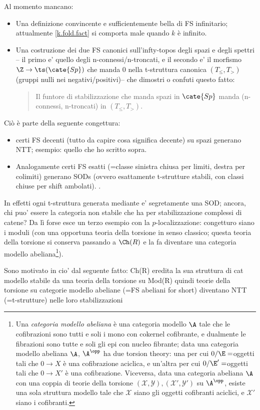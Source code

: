 


Al momento mancano:
\begin{itemize}
	\item Una definizione convincente e sufficientemente bella di FS infinitario; attualmente \ref{k.fold.fact} si comporta male quando $k$ è infinito.
	\item Una costruzione dei due FS canonici sull'infty-topos degli spazi e degli spettri -- il primo e' quello degli n-connessi/n-troncati, e il secondo e' il morfismo $\Z \to \ts(\cate{Sp})$ che manda 0 nella t-struttura canonica $(T_{\le}, T_{>})$ (gruppi nulli nei negativi/positivi)-- che dimostri o confuti questo fatto:
	\begin{quote}
		Il funtore di stabilizzazione che manda spazi in $\cate{Sp}$ manda (n-connessi, n-troncati) in $(T_{\le}, T_{>})$.
	\end{quote}
\end{itemize}

Ciò è parte della seguente congettura: 
\begin{itemize}
	\item certi FS decenti (tutto da capire cosa significa decente) su spazi generano NTT; esempio: quello che ho scritto sopra.
	\item Analogamente certi FS esatti (=classe sinistra chiusa per limiti, destra per colimiti) generano SODs (ovvero esattamente t-strutture stabili, con classi chiuse per shift ambolati). \cite[3.2.1]{tstructures}.
\end{itemize}
In effetti ogni t-struttura generata mediante \cite[3.2.1]{tstructures} e' segretamente una SOD; ancora, chi puo' essere la categoria non stabile che ha per stabilizzazione complessi di catene? Da lì forse esce un terzo esempio con la $p$-localizzazione: congetturo siano i moduli (con una opportuna teoria della torsione in senso classico; questa teoria della torsione si conserva passando a $\Ch(R)$ e la fa diventare una categoria modello abeliana\footnote{Una \emph{categoria modello abeliana} è una categoria modello $\A$ tale che le cofibrazioni sono tutti e soli i mono con cokernel cofibrante, e dualmente le fibrazioni sono tutte e soli gli epi con nucleo fibrante; data una categoria modello abeliana $\A$, $\A^\opp$ ha due torsion theory: una per cui $0/\E = $oggetti tali che $0\to X$ è una cofibrazione aciclica, e un'altra per cui $0/\E' = $oggetti tali che $0\to X'$ è una cofibrazione. Viceversa, data una categoria abeliana $\A$ con una coppia di teorie della torsione $(\mathcal{X}, \mathcal{Y}),(\mathcal{X}', \mathcal{Y}')$ su $\A^\opp$, esiste una sola struttura modello tale che $\mathcal X$ siano gli oggetti cofibranti aciclici, e $\mathcal{X}'$ siano i cofibranti.}).

Sono motivato in cio' dal seguente fatto: Ch(R) eredita la sua struttura di cat modello stabile da una teoria della torsione su Mod(R)
quindi teorie della torsione su categorie modello abeliane (=FS abeliani for short) diventano NTT (=t-strutture) nelle loro stabilizzazioni
